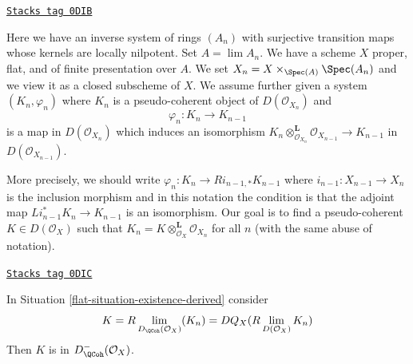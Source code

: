 \begin{definition}
\label{flat-situation-existence-derived}
\href{https://stacks.math.columbia.edu/tag/0DIB}{\texttt{Stacks tag 0DIB}}

Here we have an inverse system of rings $(A_n)$ with surjective transition
maps whose kernels are locally nilpotent. Set $A = \lim A_n$. We have a
scheme $X$ proper, flat, and of finite presentation over $A$.
We set $X_n = X \times_{\Spec(A)} \Spec(A_n)$ and we
view it as a closed subscheme of $X$. We assume further given a system
$(K_n, \varphi_n)$ where $K_n$ is a pseudo-coherent object of
$D(\mathcal{O}_{X_n})$ and
$$
\varphi_n : K_n \longrightarrow K_{n - 1}
$$
is a map in $D(\mathcal{O}_{X_n})$ which induces an isomorphism
$K_n \otimes_{\mathcal{O}_{X_n}}^\mathbf{L} \mathcal{O}_{X_{n - 1}}
\to K_{n - 1}$ in $D(\mathcal{O}_{X_{n - 1}})$.
\end{definition}

More precisely, we should write
$\varphi_n : K_n \to Ri_{n - 1, *}K_{n - 1}$
where $i_{n - 1} : X_{n - 1} \to X_n$ is the inclusion morphism
and in this notation the condition is that the adjoint
map $Li_{n - 1}^*K_n \to K_{n - 1}$ is an isomorphism.
Our goal is to find a pseudo-coherent $K \in D(\mathcal{O}_X)$
such that $K_n = K \otimes_{\mathcal{O}_X}^\mathbf{L} \mathcal{O}_{X_n}$
for all $n$ (with the same abuse of notation).

\begin{lemma}
\label{flat-lemma-compute-what-it-should-be-derived}
\href{https://stacks.math.columbia.edu/tag/0DIC}{\texttt{Stacks tag 0DIC}}

In Situation \ref{flat-situation-existence-derived} consider
$$
K = R\lim_{D_\QCoh(\mathcal{O}_X)}(K_n) =
DQ_X(R\lim_{D(\mathcal{O}_X)} K_n)
$$
Then $K$ is in $D^-_{\QCoh}(\mathcal{O}_X)$.
\end{lemma}

